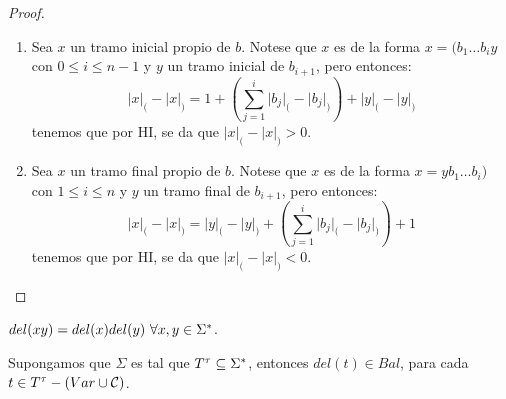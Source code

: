 \begin{proof}
\begin{enumerate}[(1)]
      \item Sea $x$ un tramo inicial propio de $b$. Notese que $x$ es de la forma $x = (b_{1} \dotsc b_{i} y$ con
        $0 \leq i \leq n-1$ y $y$ un tramo inicial de $b_{i+1}$, pero entonces:
        \[
          \lvert x \rvert_{(} - \lvert x \rvert_{)} = 1 + \left(\sum_{j=1}^{i} \lvert b_{j} \rvert_{(} - \lvert b_{j}
          \rvert_{)}\right) + \lvert y \rvert_{(} - \lvert y \rvert_{)}
        \]
      tenemos que por HI, se da que $\lvert x \rvert_{(} - \lvert x \rvert_{)} > 0$.

      \item Sea $x$ un tramo final propio de $b$. Notese que $x$ es de la forma $x = y b_{1} \dotsc b_{i})$ con
        $1 \leq i \leq n$ y $y$ un tramo final de $b_{i+1}$, pero entonces:
        \[
          \lvert x \rvert_{(} - \lvert x \rvert_{)} = \lvert y \rvert_{(} - \lvert y \rvert_{)} + \left(\sum_{j=1}^{i}
          \lvert b_{j} \rvert_{(} - \lvert b_{j} \rvert_{)}\right) + 1
        \]
      tenemos que por HI, se da que $\lvert x \rvert_{(} - \lvert x \rvert_{)} < 0$.
    \end{enumerate}
  \end{proof}

  \begin{lemma} \label{lemma_31}
    \PN $del(xy) = del(x)del(y) \ \forall x, y \in \Sigma^{\ast}$.
  \end{lemma}

  \begin{lemma} \label{lemma_32}
    \PN Supongamos que $\Sigma$ es tal que $T^{\tau} \subseteq \Sigma^{\ast}$, entonces $del(t) \in Bal$, para cada $t \in T^{\tau} -
    (Var \cup \mathcal{C})$.
  \end{lemma}

